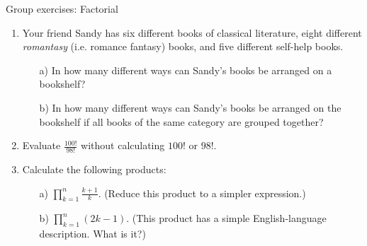 \documentclass[10pt]{beamer}
\begin{document}
\begin{frame}{Group exercises: Factorial}


\begin{enumerate}
\item Your friend Sandy has six different books of classical literature, eight different \textit{romantasy} (i.e. romance fantasy) books, and five different self-help books.
	\begin{itemize}
	\item[a)] In how many different ways can Sandy's books be arranged on a bookshelf?
	\item[b)] In how many different ways can Sandy's books be arranged on the bookshelf if all books of the same category are grouped together? 
	\end{itemize}
\item Evaluate $\frac{100!}{98!}$ without calculating $100!$ or $98!$.
\item Calculate the following products:
	\begin{itemize}
	\item[a)] $\prod_{k=1}^n \frac{k+1}{k}$.  \qquad (Reduce this product to a simpler expression.)
	\item[b)] $\prod_{k=1}^n (2k-1)$.  \qquad  (This product has a simple English-language description.  What is it?)
	\end{itemize}
\end{enumerate}

\end{frame}
\end{document}
